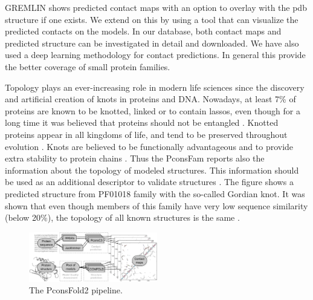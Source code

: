 \documentclass[a4,center,fleqn]{NAR}
\begin{document}
GREMLIN shows predicted contact maps with an option to overlay with
the pdb structure if one exists. We extend on this by using a tool
that can visualize the predicted contacts on the models. In our
database, both contact maps and predicted structure can be
investigated in detail and downloaded.  We have also used a deep
learning methodology for contact predictions. In general this provide
the better coverage of small protein families.


Topology plays an ever-increasing role in modern life sciences since
the discovery and artificial creation of knots in proteins and DNA.
Nowadays, at least 7\% of proteins are known to be knotted, linked or
to contain lassos, even though for a long time it was believed that
proteins should not be entangled \cite{sulkowska2018entangled}. Knotted proteins appear in all
kingdoms of life, and tend to be preserved throughout evolution \cite{sulkowska2012conservation}. 
Knots are believed to be functionally advantageous and to provide extra
stability to protein chains \cite{christian2016methyl}.
Thus the PconsFam reports also the information about the topology of
modeled structures. This information should be used as an additional
descriptor to validate structures \cite{khatib2006rapid}. The figure shows a
predicted structure from PF01018 family with the so-called Gordian
knot. It was shown that even though members of this family have very
low sequence similarity (below 20\%), the topology of all known
structures is the same \cite{sulkowska2012conservation}.


\begin{figure}[t]
\begin{center}
\end{center}
    \includegraphics[width=0.5\textwidth]{figures/flowchart.eps}
\caption{The PconsFold2 pipeline.}
\label{fig:Pipeline}
\end{figure}
\end{document}
